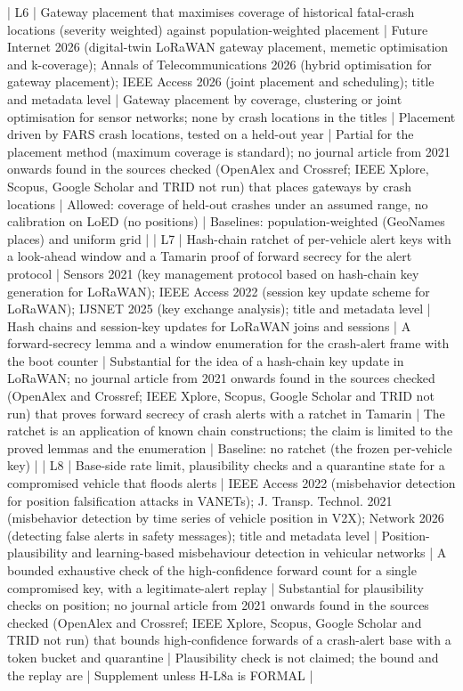 | L6 | Gateway placement that maximises coverage of historical fatal-crash locations (severity weighted) against population-weighted placement | Future Internet 2026 (digital-twin LoRaWAN gateway placement, memetic optimisation and k-coverage); Annals of Telecommunications 2026 (hybrid optimisation for gateway placement); IEEE Access 2026 (joint placement and scheduling); title and metadata level | Gateway placement by coverage, clustering or joint optimisation for sensor networks; none by crash locations in the titles | Placement driven by FARS crash locations, tested on a held-out year | Partial for the placement method (maximum coverage is standard); no journal article from 2021 onwards found in the sources checked (OpenAlex and Crossref; IEEE Xplore, Scopus, Google Scholar and TRID not run) that places gateways by crash locations | Allowed: coverage of held-out crashes under an assumed range, no calibration on LoED (no positions) | Baselines: population-weighted (GeoNames places) and uniform grid |
| L7 | Hash-chain ratchet of per-vehicle alert keys with a look-ahead window and a Tamarin proof of forward secrecy for the alert protocol | Sensors 2021 (key management protocol based on hash-chain key generation for LoRaWAN); IEEE Access 2022 (session key update scheme for LoRaWAN); IJSNET 2025 (key exchange analysis); title and metadata level | Hash chains and session-key updates for LoRaWAN joins and sessions | A forward-secrecy lemma and a window enumeration for the crash-alert frame with the boot counter | Substantial for the idea of a hash-chain key update in LoRaWAN; no journal article from 2021 onwards found in the sources checked (OpenAlex and Crossref; IEEE Xplore, Scopus, Google Scholar and TRID not run) that proves forward secrecy of crash alerts with a ratchet in Tamarin | The ratchet is an application of known chain constructions; the claim is limited to the proved lemmas and the enumeration | Baseline: no ratchet (the frozen per-vehicle key) |
| L8 | Base-side rate limit, plausibility checks and a quarantine state for a compromised vehicle that floods alerts | IEEE Access 2022 (misbehavior detection for position falsification attacks in VANETs); J. Transp. Technol. 2021 (misbehavior detection by time series of vehicle position in V2X); Network 2026 (detecting false alerts in safety messages); title and metadata level | Position-plausibility and learning-based misbehaviour detection in vehicular networks | A bounded exhaustive check of the high-confidence forward count for a single compromised key, with a legitimate-alert replay | Substantial for plausibility checks on position; no journal article from 2021 onwards found in the sources checked (OpenAlex and Crossref; IEEE Xplore, Scopus, Google Scholar and TRID not run) that bounds high-confidence forwards of a crash-alert base with a token bucket and quarantine | Plausibility check is not claimed; the bound and the replay are | Supplement unless H-L8a is FORMAL |
